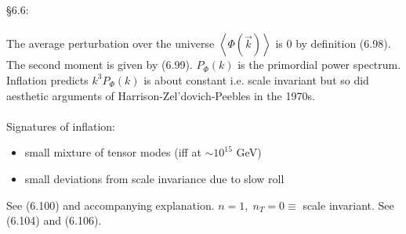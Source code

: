 \documentclass{article}
\begin{document}
\\ \\
\S 6.6:
\\ \\
The average perturbation over the universe $\left<\Phi(\vec{k})\right>$ is 0 by definition (6.98).  The second moment is given by (6.99).  $P_\Phi(k)$ is the primordial power spectrum.  Inflation predicts $k^3P_\Phi(k)$ is about constant i.e. scale invariant but so did aesthetic arguments of Harrison-Zel'dovich-Peebles in the 1970s.
\\ \\
Signatures of inflation:
\begin{itemize}
\item small mixture of tensor modes (iff at $\sim 10^15$ GeV)
\item small deviations from scale invariance due to slow roll
\end{itemize}
See (6.100) and accompanying explanation.  $n=1,\;n_T=0\equiv$ scale invariant.  See (6.104) and (6.106).
\end{document}
